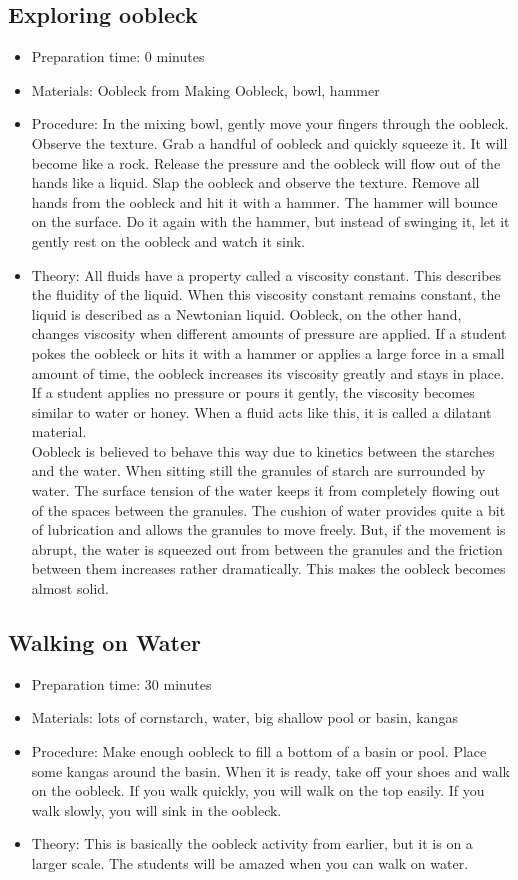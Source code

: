 \subsection{Exploring oobleck}
\begin{itemize}
\item{Preparation time: 0 minutes}
\item{Materials: Oobleck from Making Oobleck, bowl, hammer}
\item{Procedure: In the mixing bowl, gently move your fingers through the oobleck. Observe the texture. Grab a handful of oobleck and quickly squeeze it. It will become like a rock. Release the pressure and the oobleck will flow out of the hands like a liquid. Slap the oobleck and observe the texture. Remove all hands from the oobleck and hit it with a hammer. The hammer will bounce on the surface. Do it again with the hammer, but instead of swinging it, let it gently rest on the oobleck and watch it sink.}
\item{Theory: All fluids have a property called a viscosity constant. This describes the fluidity of the liquid. When this viscosity constant remains constant, the liquid is described as a Newtonian liquid. Oobleck, on the other hand, changes viscosity when different amounts of pressure are applied. If a student pokes the oobleck or hits it with a hammer or applies a large force in a small amount of time, the oobleck increases its viscosity greatly and stays in place. If a student applies no pressure or pours it gently, the viscosity becomes similar to water or honey. When a fluid acts like this, it is called a dilatant material. \\
Oobleck is believed to behave this way due to kinetics between the starches and the water. When sitting still the granules of starch are surrounded by water. The surface tension of the water keeps it from completely flowing out of the spaces between the granules. The cushion of water provides quite a bit of lubrication and allows the granules to move freely. But, if the movement is abrupt, the water is squeezed out from between the granules and the friction between them increases rather dramatically. This makes the oobleck becomes almost solid. }
\end{itemize}

\subsection{Walking on Water}
\begin{itemize}
\item{Preparation time: 30 minutes}
\item{Materials: lots of cornstarch, water, big shallow pool or basin, kangas}
\item{Procedure: Make enough oobleck to fill a bottom of a basin or pool. Place some kangas around the basin. When it is ready, take off your shoes and walk on the oobleck. If you walk quickly, you will walk on the top easily. If you walk slowly, you will sink in the oobleck.}
\item{Theory: This is basically the oobleck activity from earlier, but it is on a larger scale. The students will be amazed when you can walk on water.}
\end{itemize}

